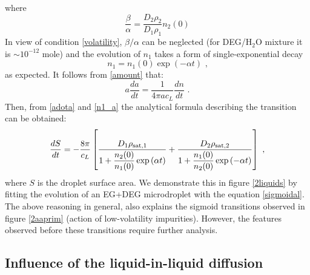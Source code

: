 \documentclass[twoside,twocolumn,9pt]{article}
\begin{document}
where
\begin{equation*}
\frac{\beta}{\alpha} = \frac{D_2\rho_2}{D_1\rho_1} n_{2}(0)
\end{equation*}
In view of condition \ref{volatility}, $\beta / \alpha$ can be neglected (for DEG/H$_2$O mixture it is $\sim 10^{-12}$ mole) and the evolution of $n_1$ takes a form of single-exponential decay
\begin{equation}
n_1 =  n_{1}(0) \exp \left( -\alpha t \right) \mbox{~,}
\label{decay}
\end{equation}
as expected. It follows from \ref{amount} that:
\begin{equation}
a\frac{da}{dt} = \frac{1}{4\pi ac_L} \frac{dn}{dt}  \mbox{~.}
\label{adota}
\end{equation}
Then, from \ref{adota} and \ref{n1_a} the analytical formula describing the transition can be obtained:
\begin{equation}
\frac{dS}{dt} = -\frac{8\pi}{c_L} \left[ \frac{D_1\rho_{{\rm sat},1}}{1+\dfrac{n_{2}(0)}{n_{1}(0)}\exp\left(\alpha t\right)} + \dfrac{D_2\rho_{{\rm sat},2}}{1+\dfrac{n_{1}(0)}{n_{2}(0)}\exp\left(-\alpha t\right)} \right] \mbox{~,}
\label{sigmoidal}
\end{equation}
where $S$ is the droplet surface area. We demonstrate this in figure \ref{2liquids} by fitting the evolution of an EG+DEG microdroplet with the equation \ref{sigmoidal}. The above reasoning in general, also explains the sigmoid transitions observed in figure \ref{2aaprim} (action of low-volatility impurities). However, the features observed before these transitions require further analysis.

\subsection{Influence of the liquid-in-liquid diffusion} \label{liquid-liquid}
\end{document}
